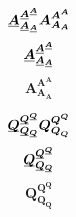 \documentclass[9pt,headings=standardclasses,parskip=half]{scrartcl}
\newcommand*\matrspace{0.8mu}
\newcommand{\matr}[1]{\mspace{\matrspace}\underline{\mspace{-\matrspace}\smash[b]{\boldsymbol{#1}}\mspace{-\matrspace}}\mspace{\matrspace}}
\begin{document}
















\[
\matr{A}_{\matr{A}_{\matr{A}}}^{\matr{A}^{\matr{A}}}
\boldsymbol{A}_{\boldsymbol{A}_{\boldsymbol{A}}}^{\boldsymbol{A}^{\boldsymbol{A}}}
\]
\[
\matr{A}_{\matr{A}_{\matr{A}}}^{\matr{A}^{\matr{A}}}
\]
\[
\boldsymbol{A}_{\boldsymbol{A}_{\boldsymbol{A}}}^{\boldsymbol{A}^{\boldsymbol{A}}}
\]

\[
\matr{Q}_{\matr{Q}_{\matr{Q}}}^{\matr{Q}^{\matr{Q}}}
\boldsymbol{Q}_{\boldsymbol{Q}_{\boldsymbol{Q}}}^{\boldsymbol{Q}^{\boldsymbol{Q}}}
\]
\[
\matr{Q}_{\matr{Q}_{\matr{Q}}}^{\matr{Q}^{\matr{Q}}}
\]
\[
\boldsymbol{Q}_{\boldsymbol{Q}_{\boldsymbol{Q}}}^{\boldsymbol{Q}^{\boldsymbol{Q}}}
\] 
\end{document}
